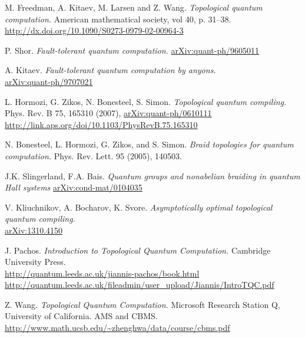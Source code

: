 \documentclass[a4paper,10pt,oneside]{book}
\theoremstyle{plain}
\theoremstyle{definition}
\theoremstyle{remark}
\begin{document}
\begin{thebibliography}{99}
    M. Freedman, A. Kitaev, M. Larsen and Z. Wang.
    \textit{Topological quantum computation.}
    American mathematical society, vol 40, p. 31–38.
    \\
    \url{http://dx.doi.org/10.1090/S0273-0979-02-00964-3}

    P. Shor.
    \textit{Fault-tolerant quantum computation.}
    \href{https://arxiv.org/abs/quant-ph/9605011}{arXiv:quant-ph/9605011}

    A. Kitaev.
    \textit{Fault-tolerant quantum computation by anyons.}
    \\
    \href{https://arxiv.org/abs/quant-ph/9707021}{arXiv:quant-ph/9707021}

    L. Hormozi, G. Zikos, N. Bonesteel, S. Simon.
    \textit{Topological quantum compiling.}
    Phys. Rev. B 75, 165310 (2007), \href{https://arxiv.org/abs/quant-ph/0610111}{arXiv:quant-ph/0610111}
    \\
    \url{http://link.aps.org/doi/10.1103/PhysRevB.75.165310}

  \bibitem{}
    N. Bonesteel, L. Hormozi, G. Zikos, and S. Simon.
    \textit{Braid topologies for quantum computation.}
    Phys. Rev. Lett. 95 (2005), 140503.

    J.K. Slingerland, F.A. Bais.
    \textit{Quantum groups and nonabelian braiding in quantum Hall systems}
    \href{https://arxiv.org/abs/cond-mat/0104035}{arXiv:cond-mat/0104035}

    V. Kliuchnikov, A. Bocharov, K. Svore.
    \textit{Asymptotically optimal topological quantum compiling.}
    \\
    \href{https://arxiv.org/abs/1310.4150}{arXiv:1310.4150}

    J. Pachos.
    \textit{Introduction to Topological Quantum Computation.}
    Cambridge University Press.
    \\
    \url{http://quantum.leeds.ac.uk/jiannis-pachos/book.html}
    \\
    \url{http://quantum.leeds.ac.uk/fileadmin/user_upload/Jiannis/IntroTQC.pdf}

    Z. Wang.
    \textit{Topological Quantum Computation.}
    Microsoft Research Station Q, University of California.
    AMS and CBMS.
    \url{http://www.math.ucsb.edu/~zhenghwa/data/course/cbms.pdf}


\end{thebibliography}
\end{document}
